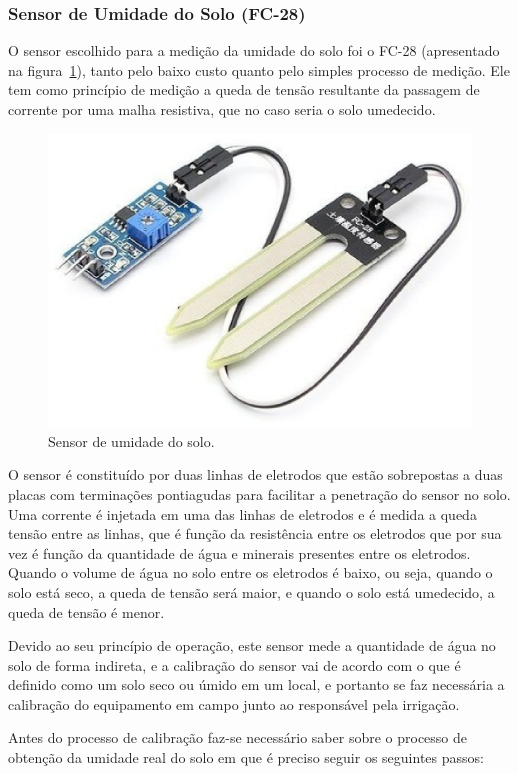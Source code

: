 	\subsubsection{Sensor de Umidade do Solo (FC-28)}

		O sensor escolhido para a medição da umidade do solo foi o FC-28 (apresentado
		na figura~\ref{fig:fc28}),
		tanto pelo baixo custo quanto pelo simples processo de medição.
		Ele tem como princípio de medição a queda de tensão resultante da
		passagem de corrente por uma malha resistiva, que no caso seria o solo
		umedecido.

		\begin{figure}[!htbp]
		\begin{center}
		\includegraphics[width=.5\textwidth]{figuras/higrometer.eps}
		\caption{\label{fig:fc28}Sensor de umidade do solo.}
		\end{center}
		\end{figure}

		O sensor é constituído por duas linhas de eletrodos que estão
		sobrepostas a duas placas com terminações pontiagudas para facilitar a
		penetração do sensor no solo. Uma corrente é injetada em uma das linhas
		de eletrodos e é medida a queda tensão entre as linhas, que é função da
		resistência entre os eletrodos que por sua vez é função da quantidade de
		água e minerais presentes entre os eletrodos. Quando o volume de água no
		solo entre os eletrodos é baixo, ou seja, quando o solo está seco,
		a queda de tensão será maior, e quando o solo está umedecido,
		a queda de tensão é menor.

		Devido ao seu princípio de operação, este sensor mede a quantidade de
		água no solo de forma indireta, e a calibração do sensor vai de acordo
		com o que é definido como um solo seco ou úmido em um local, e portanto
		se faz necessária a calibração do equipamento em campo junto ao
		responsável pela irrigação.

		Antes do processo de calibração faz-se necessário saber sobre o processo de obtenção
		da umidade real do solo em que é preciso seguir os seguintes passos:

